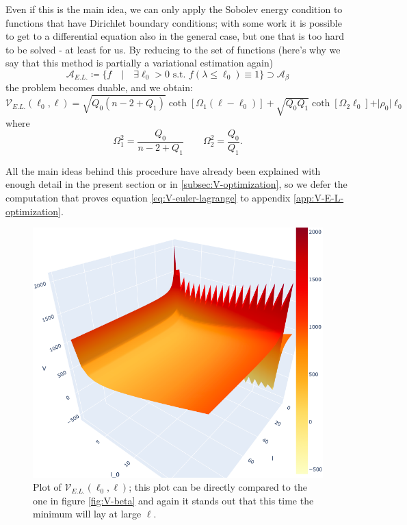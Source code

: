 Even if this is the main idea, we can only apply the Sobolev energy condition to functions that have Dirichlet boundary conditions; with some work it is possible to get to a differential equation also in the general case, but one that is too hard to be solved - at least for us.
By reducing to the set of functions (here's why we say that this method is partially a variational estimation again)
\[
\mathcal{A}_{E.L.} \coloneqq \{f \quad \vert \quad \exists \ell_0 > 0 \text{ s.t. } f(\lambda \le \ell_0) \equiv 1\} \supset \mathcal{A}_{\beta}
\]
the problem becomes duable, and we obtain:
\begin{equation}
	\label{eq:V-euler-lagrange}
	\mathcal{V}_{E.L.}(\ell_0, \ell) = \sqrt{Q_0(n - 2 + Q_1)}\coth\left[\Omega_1(\ell- \ell_0)\right] + \sqrt{Q_0Q_1}\coth\left[\Omega_2\ell_0\right] + \vert \rho_0\vert\ell_0
\end{equation}
where
\[
\Omega_1^2 = \frac{Q_0}{n - 2 + Q_1} \quad \quad  \Omega_2^2 = \frac{Q_0}{Q_1}.
\]

All the main ideas behind this procedure have already been explained with enough detail in the present section or in \ref{subsec:V-optimization}, so we defer the computation that proves equation \eqref{eq:V-euler-lagrange} to appendix \ref{app:V-E-L-optimization}.

\begin{figure}
	\includegraphics[scale=0.3]{Immagini/V-E-L.png}
	\caption[]{Plot of \(\mathcal{V}_{E.L.}(\ell_0, \ell)\); this plot can be directly compared to the one in figure \ref{fig:V-beta} and again it stands out that this time the minimum will lay at large \(\ell\).}
	\label{fig:V-E-L}
\end{figure}

